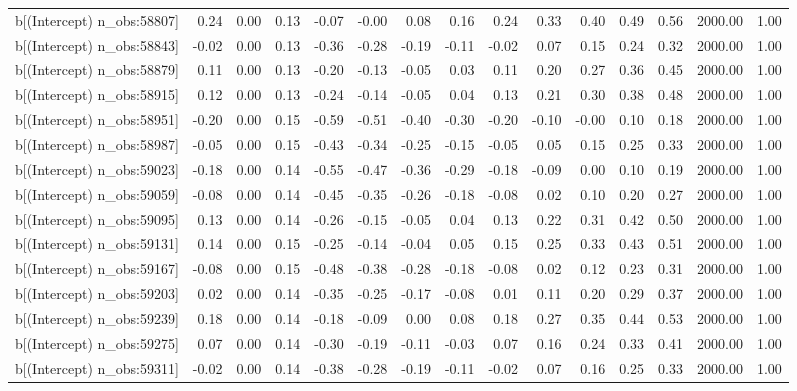 \begin{table}[ht]
\begin{tabular}{rrrrrrrrrrrrrrr}
  b[(Intercept) n\_obs:58807] & 0.24 & 0.00 & 0.13 & -0.07 & -0.00 & 0.08 & 0.16 & 0.24 & 0.33 & 0.40 & 0.49 & 0.56 & 2000.00 & 1.00 \\ 
  b[(Intercept) n\_obs:58843] & -0.02 & 0.00 & 0.13 & -0.36 & -0.28 & -0.19 & -0.11 & -0.02 & 0.07 & 0.15 & 0.24 & 0.32 & 2000.00 & 1.00 \\ 
  b[(Intercept) n\_obs:58879] & 0.11 & 0.00 & 0.13 & -0.20 & -0.13 & -0.05 & 0.03 & 0.11 & 0.20 & 0.27 & 0.36 & 0.45 & 2000.00 & 1.00 \\ 
  b[(Intercept) n\_obs:58915] & 0.12 & 0.00 & 0.13 & -0.24 & -0.14 & -0.05 & 0.04 & 0.13 & 0.21 & 0.30 & 0.38 & 0.48 & 2000.00 & 1.00 \\ 
  b[(Intercept) n\_obs:58951] & -0.20 & 0.00 & 0.15 & -0.59 & -0.51 & -0.40 & -0.30 & -0.20 & -0.10 & -0.00 & 0.10 & 0.18 & 2000.00 & 1.00 \\ 
  b[(Intercept) n\_obs:58987] & -0.05 & 0.00 & 0.15 & -0.43 & -0.34 & -0.25 & -0.15 & -0.05 & 0.05 & 0.15 & 0.25 & 0.33 & 2000.00 & 1.00 \\ 
  b[(Intercept) n\_obs:59023] & -0.18 & 0.00 & 0.14 & -0.55 & -0.47 & -0.36 & -0.29 & -0.18 & -0.09 & 0.00 & 0.10 & 0.19 & 2000.00 & 1.00 \\ 
  b[(Intercept) n\_obs:59059] & -0.08 & 0.00 & 0.14 & -0.45 & -0.35 & -0.26 & -0.18 & -0.08 & 0.02 & 0.10 & 0.20 & 0.27 & 2000.00 & 1.00 \\ 
  b[(Intercept) n\_obs:59095] & 0.13 & 0.00 & 0.14 & -0.26 & -0.15 & -0.05 & 0.04 & 0.13 & 0.22 & 0.31 & 0.42 & 0.50 & 2000.00 & 1.00 \\ 
  b[(Intercept) n\_obs:59131] & 0.14 & 0.00 & 0.15 & -0.25 & -0.14 & -0.04 & 0.05 & 0.15 & 0.25 & 0.33 & 0.43 & 0.51 & 2000.00 & 1.00 \\ 
  b[(Intercept) n\_obs:59167] & -0.08 & 0.00 & 0.15 & -0.48 & -0.38 & -0.28 & -0.18 & -0.08 & 0.02 & 0.12 & 0.23 & 0.31 & 2000.00 & 1.00 \\ 
  b[(Intercept) n\_obs:59203] & 0.02 & 0.00 & 0.14 & -0.35 & -0.25 & -0.17 & -0.08 & 0.01 & 0.11 & 0.20 & 0.29 & 0.37 & 2000.00 & 1.00 \\ 
  b[(Intercept) n\_obs:59239] & 0.18 & 0.00 & 0.14 & -0.18 & -0.09 & 0.00 & 0.08 & 0.18 & 0.27 & 0.35 & 0.44 & 0.53 & 2000.00 & 1.00 \\ 
  b[(Intercept) n\_obs:59275] & 0.07 & 0.00 & 0.14 & -0.30 & -0.19 & -0.11 & -0.03 & 0.07 & 0.16 & 0.24 & 0.33 & 0.41 & 2000.00 & 1.00 \\ 
  b[(Intercept) n\_obs:59311] & -0.02 & 0.00 & 0.14 & -0.38 & -0.28 & -0.19 & -0.11 & -0.02 & 0.07 & 0.16 & 0.25 & 0.33 & 2000.00 & 1.00 \\ 

\end{tabular}
\end{table}
